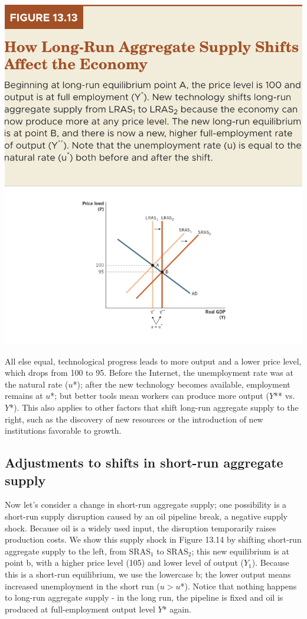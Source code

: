 \documentclass[11pt]{article} %
\begin{document}
\begin{center}
\includegraphics[scale=0.5]{images/Figure 13.13.png}
\end{center}

All else equal, technological progress leads to more output and a lower price level, which drops from 100 to 95. Before the Internet, the unemployment rate was at the natural rate (\(u\)*); after the new technology becomes available, employment remains at \(u\)*; but better tools mean workers can produce more output (\(Y\)** vs. \(Y\)*). This also applies to other factors that shift long-run aggregate supply to the right, such as the discovery of new resources or the introduction of new institutions favorable to growth.

\subsection*{Adjustments to shifts in short-run aggregate supply}
Now let's consider a change in short-run aggregate supply; one possibility is a short-run supply disruption caused by an oil pipeline break, a negative supply shock. Because oil is a widely used input, the disruption temporarily raises production costs. We show this supply shock in Figure 13.14 by shifting short-run aggregate supply to the left, from \(\text{SRAS}_1\) to \(\text{SRAS}_2\); this new equilibrium is at point b, with a higher price level (105) and lower level of output (\(Y_1\)). Because this is a short-run equilibrium, we use the lowercase b; the lower output means increased unemployment in the short run (\(u > u\)*). Notice that nothing happens to long-run aggregate supply - in the long run, the pipeline is fixed and oil is produced at full-employment output level \(Y\)* again.
\end{document}
